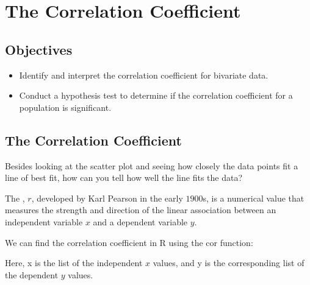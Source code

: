 \documentclass[letterpaper,10pt,english]{jupyterBook}
\begin{document}
\sphinxstepscope


\section{The Correlation Coefficient}
\label{\detokenize{Ch8 Correlation and Linear Regression/8.4 The Correlation Coefficient:the-correlation-coefficient}}\label{\detokenize{Ch8 Correlation and Linear Regression/8.4 The Correlation Coefficient::doc}}

\subsection{Objectives}
\label{\detokenize{Ch8 Correlation and Linear Regression/8.4 The Correlation Coefficient:objectives}}\begin{itemize}
\item {} 
\sphinxAtStartPar
Identify and interpret the correlation coefficient for bivariate data.

\item {} 
\sphinxAtStartPar
Conduct a hypothesis test to determine if the correlation coefficient for a population is significant.

\end{itemize}


\subsection{The Correlation Coefficient}
\label{\detokenize{Ch8 Correlation and Linear Regression/8.4 The Correlation Coefficient:id1}}
\sphinxAtStartPar
Besides looking at the scatter plot and seeing how closely the data points fit a line of best fit, how can you tell how well the line fits the data?

\sphinxAtStartPar
The , \(r\), developed by Karl Pearson in the early \(1900\)s, is a numerical value that measures the strength and direction of the linear association between an independent variable \(x\) and a dependent variable \(y\).

\sphinxAtStartPar
We can find the correlation coefficient in R using the cor function:

\begin{sphinxVerbatim}[commandchars=\\\{\}]
\end{sphinxVerbatim}

\sphinxAtStartPar
Here, x is the list of the independent \(x\) values, and y is the corresponding list of the dependent \(y\) values.
\end{document}
